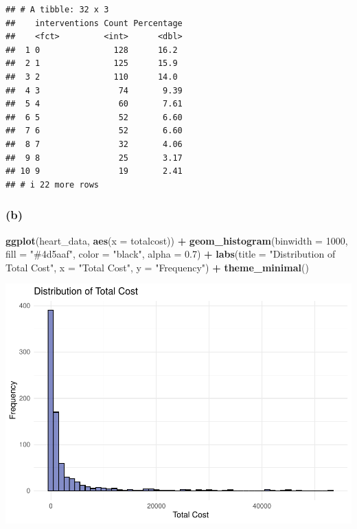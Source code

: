 \documentclass[
]{article}
\newenvironment{Shaded}{\begin{snugshade}}{\end{snugshade}}
\newcommand{\AttributeTok}[1]{\textcolor[rgb]{0.13,0.29,0.53}{#1}}
\newcommand{\DecValTok}[1]{\textcolor[rgb]{0.00,0.00,0.81}{#1}}
\newcommand{\FloatTok}[1]{\textcolor[rgb]{0.00,0.00,0.81}{#1}}
\newcommand{\FunctionTok}[1]{\textcolor[rgb]{0.13,0.29,0.53}{\textbf{#1}}}
\newcommand{\NormalTok}[1]{#1}
\newcommand{\SpecialCharTok}[1]{\textcolor[rgb]{0.81,0.36,0.00}{\textbf{#1}}}
\newcommand{\StringTok}[1]{\textcolor[rgb]{0.31,0.60,0.02}{#1}}
\begin{document}
\begin{verbatim}
## # A tibble: 32 x 3
##    interventions Count Percentage
##    <fct>         <int>      <dbl>
##  1 0               128      16.2 
##  2 1               125      15.9 
##  3 2               110      14.0 
##  4 3                74       9.39
##  5 4                60       7.61
##  6 5                52       6.60
##  7 6                52       6.60
##  8 7                32       4.06
##  9 8                25       3.17
## 10 9                19       2.41
## # i 22 more rows
\end{verbatim}

\subsubsection{(b)}\label{b-1}

\begin{Shaded}
\begin{Highlighting}[]
\FunctionTok{ggplot}\NormalTok{(heart\_data, }\FunctionTok{aes}\NormalTok{(}\AttributeTok{x =}\NormalTok{ totalcost)) }\SpecialCharTok{+}
  \FunctionTok{geom\_histogram}\NormalTok{(}\AttributeTok{binwidth =} \DecValTok{1000}\NormalTok{, }\AttributeTok{fill =} \StringTok{"\#4d5aaf"}\NormalTok{, }\AttributeTok{color =} \StringTok{"black"}\NormalTok{, }\AttributeTok{alpha =} \FloatTok{0.7}\NormalTok{) }\SpecialCharTok{+}
  \FunctionTok{labs}\NormalTok{(}\AttributeTok{title =} \StringTok{"Distribution of Total Cost"}\NormalTok{, }\AttributeTok{x =} \StringTok{"Total Cost"}\NormalTok{, }\AttributeTok{y =} \StringTok{"Frequency"}\NormalTok{) }\SpecialCharTok{+}
  \FunctionTok{theme\_minimal}\NormalTok{()}
\end{Highlighting}
\end{Shaded}

\includegraphics{p8130_hw4_xx2485_files/figure-latex/unnamed-chunk-10-1.pdf}
\end{document}
